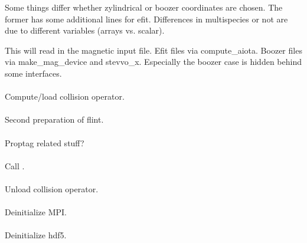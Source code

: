 Some things differ whether zylindrical or boozer coordinates are chosen.
The former has some additional lines for efit.
Differences in multispecies or not are due to different variables
(arrays vs. scalar).

This will read in the magnetic input file.
Efit files via compute\_aiota.
Boozer files via make\_mag\_device and stevvo\_x. Especially the boozer
case is hidden behind some interfaces.

\paragraph{}
Compute/load collision operator.

\paragraph{}
Second preparation of flint.

\paragraph{}
Proptag related stuff?

\paragraph{}
Call .

\paragraph{}
Unload collision operator.

\paragraph{}
Deinitialize MPI.

\paragraph{}
Deinitialize hdf5.
